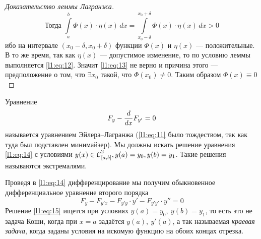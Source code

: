\documentclass[12pt,a4paper,openany,fleqn]{book}
\newcommand{\Cf}{\ensuremath{\mathcal{C}}}
\newcommand{\Cfn}[2][]{\ensuremath{\Cf{\mathstrut}^{#2}_{#1}}}
\newcommand{\der}[2]{\ensuremath{\frac{d#1}{d#2}}}
\theoremstyle{definition}
\begin{document}
\begin{proof}[Доказательство леммы Лагранжа]
\begin{tikzpicture}[x=0.75pt,y=0.75pt,yscale=-1,xscale=1]
	
\end{tikzpicture}

\begin{equation}
	\label{l1:eq:13}
	\text{Тогда }\int\limits_a^b \Phi(x)\cdot\eta(x)\,dx=\int\limits_{x_0-\delta}^{x_0+\delta} \Phi(x)\cdot\eta(x)\,dx>0
\end{equation}
ибо на интервале $(x_0-\delta,x_0+\delta)$ функции $\Phi(x)$ и $\eta(x)$ --- положительные. В то же время, так как $\eta(x)$ --- допустимое изменение, то по условию леммы выполняется \eqref{l1:eq:12}. Значит \eqref{l1:eq:13} не верно и причина этого --- предположение о том, что $\exists x_0$ такой, что $\Phi(x_0)\neq0$. Таким образом $\Phi(x)\equiv0$ 
\end{proof}

Уравнение
\begin{equation}
	\label{l1:eq:14}
	\hfill F_y-\der{}{x}F_{y'}=0\hfill
\end{equation} 
называется уравнением Эйлера--Лагранжа (\eqref{l1:eq:11} было тождеством, так как туда был подставлен минимайзер). Мы должны искать решение уравнения \eqref{l1:eq:14} с условиями $y(x)\in\Cfn[{[a,b]}]{2},\\ y(a)=y_0, y(b)=y_1$. Такие решения называются экстремалями.

Проведя в \eqref{l1:eq:14} дифференцирование мы получим обыкновенное дифференциальное уравнение второго порядка 
\begin{equation}
	\label{l1:eq:15}
	F_y-F_{y'x}-F_{y'y}\cdot y'-F_{y'y'}\cdot y''=0
\end{equation}
Решение \eqref{l1:eq:15} ищется при условиях $y(a)=y_0,\ y(b)=y_1$, то есть это не задача Коши, когда при $x=a$ задаётся $y(a),\ y'(a)$, а так называемая \emph{краевая задача}, когда заданы условия на искомую функцию на обоих концах отрезка.
\vspace{0.2cm}
		
\end{document}
